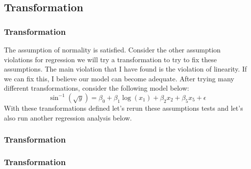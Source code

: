 \documentclass[12pt]{beamer}
\begin{document}
\subsection{Transformation}
\begin{frame}
\frametitle{Transformation}
The assumption of normality is satisfied. Consider the other assumption violations for regression we will try a transformation to try to fix these assumptions. The main violation that I have found is the violation of linearity. If we can fix this, I believe our model can become adequate. After trying many different transformations\cite{text1}, consider the following model below: $$\sin^{-1}\left(\sqrt{y}\right)=\beta_0+\beta_1\log\left(x_1\right)+\beta_2x_2+\beta_5x_5+\epsilon$$ With these transformations defined let's rerun these assumptions tests and let's also run another regression analysis below.
\end{frame}

\begin{frame}
\frametitle{Transformation}
{\scriptsize
\begin{mdframed}

\end{mdframed}}
\end{frame}

\begin{frame}
\frametitle{Transformation}
{\tiny
\begin{mdframed}

\end{mdframed}}
\end{frame}
\end{document}

